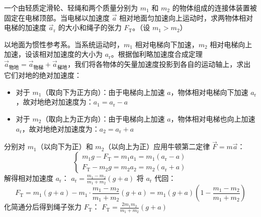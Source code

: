 \begin{example}
一个由轻质定滑轮、轻绳和两个质量分别为 $m_1$ 和 $m_2$ 的物体组成的连接体装置被固定在电梯顶部。当电梯以加速度 $\vec{a}$ 相对地面匀加速向上运动时，求两物体相对电梯的加速度 $\vec{a}_{\text{r}}$ 的大小和绳子的张力 $F_{\text{T}}$。（设 $m_1 > m_2$）
\end{example}
\begin{solution}
以地面为惯性参考系。当系统运动时，$m_1$ 相对电梯向下加速，$m_2$ 相对电梯向上加速，设该相对加速度的大小为 $a_{\text{r}}$。根据伽利略加速度合成定理 $\vec{a}_{\text{物地}} = \vec{a}_{\text{物梯}} + \vec{a}_{\text{梯地}}$，我们将各物体的矢量加速度投影到各自的运动轴上，求出它们对地的绝对加速度：
\begin{itemize}
\item 对于 $m_1$（取向下为正方向）：由于电梯向上加速 $a$，物体相对电梯向下加速 $a_{\text{r}}$，故对地绝对加速度为：$a_1 = a_{\text{r}} - a$
\item 对于 $m_2$（取向上为正方向）：由于电梯向上加速 $a$，物体相对电梯也向上加速 $a_{\text{r}}$，故对地绝对加速度为：$a_2 = a_{\text{r}} + a$
\end{itemize}
分别对 $m_1$（以向下为正）和 $m_2$（以向上为正）应用牛顿第二定律 $\vec{F} = m\vec{a}$：$$\begin{cases}
m_1g - F_{\text{T}} = m_1a_1 = m_1(a_{\text{r}} - a) \\
F_{\text{T}} - m_2g = m_2a_2 = m_2(a_{\text{r}} + a)
\end{cases}$$
解得相对加速度 $a_{\text{r}}$： \(a_{\text{r}} = \frac{m_1 - m_2}{m_1 + m_2}(g + a)\) 将 $a_{\text{r}}$ 代回：$$F_{\text{T}} = m_1(g + a) - m_1 \cdot \frac{m_1 - m_2}{m_1 + m_2}(g + a) = m_1(g + a) \left( 1 - \frac{m_1 - m_2}{m_1 + m_2} \right)$$化简通分后得到绳子张力 $F_{\text{T}}$： \(F_{\text{T}} = \frac{2m_1m_2}{m_1 + m_2}(g + a)\) 
\end{solution}



